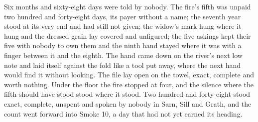 Six months and sixty-eight days were told by nobody. The fire's fifth was unpaid two hundred and forty-eight days, its payer without a name; the seventh year stood at its very end and had still not given; the widow's mark hung where it hung and the dressed grain lay covered and unfigured; the five askings kept their five with nobody to own them and the ninth hand stayed where it was with a finger between it and the eighth. The hand came down on the river's next low note and laid itself against the fold like a tool put away, where the next hand would find it without looking. The file lay open on the towel, exact, complete and worth nothing. Under the floor the fire stopped at four, and the silence where the fifth should have stood stood where it stood. Two hundred and forty-eight stood exact, complete, unspent and spoken by nobody in Sarn, Sill and Grath, and the count went forward into Smoke 10, a day that had not yet earned its heading.
